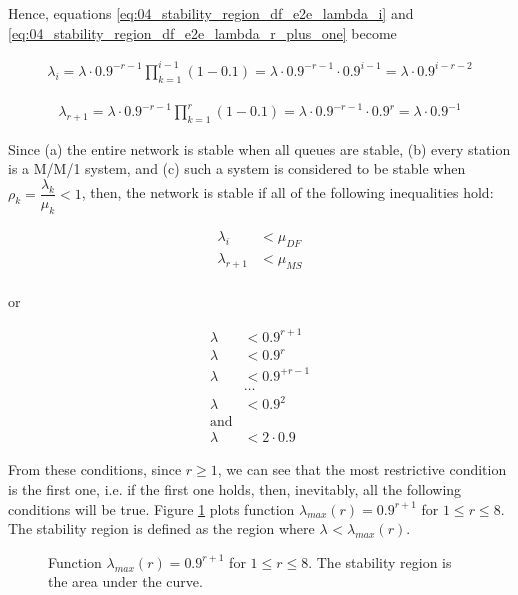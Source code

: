 Hence, equations \ref{eq:04_stability_region_df_e2e_lambda_i} and
\ref{eq:04_stability_region_df_e2e_lambda_r_plus_one} become

\begin{align*}
  \lambda_i = \lambda \cdot 0.9^{-r-1} \prod\limits_{k=1}^{i-1} (1 - 0.1) = \lambda \cdot 0.9^{-r-1} \cdot 0.9^{i-1} = \lambda \cdot 0.9^{i-r-2}
\end{align*}

\begin{align*}
  \lambda_{r+1} = \lambda \cdot 0.9^{-r-1} \prod\limits_{k=1}^{r} (1 - 0.1) = \lambda \cdot 0.9^{-r-1} \cdot 0.9^r = \lambda \cdot 0.9^{-1}
\end{align*}

Since (a) the entire network is stable when all queues are stable, (b) every
station is a M/M/1 system, and (c) such a system is considered to be stable
when $\rho_k = \dfrac{\lambda_k}{\mu_k} < 1$, then, the network is stable if all
of the following inequalities hold:

\begin{align*}
  \lambda_i &< \mu_{DF} \\
  \lambda_{r+1} &< \mu_{MS} \\
\end{align*}

or

\begin{align*}
  \lambda &< 0.9^{r+1} \\
  \lambda &< 0.9^{r} \\
  \lambda &< 0.9^{+r-1} \\
  & \dots \\
  \lambda &< 0.9^2 \\
  \text{and}\\
  \lambda &< 2 \cdot 0.9
\end{align*}

From these conditions, since $r \geq 1$, we can see that the most
restrictive condition is the first one, i.e. if the first one holds, then,
inevitably, all the following conditions will be true. Figure
\ref{fig:04_stability_region_df_e2e} plots function
$\lambda_{max}(r) = 0.9^{r+1}$ for $1 \leq r \leq 8$. The stability
region is defined as the region where $\lambda_{} < \lambda_{max}(r)$.

\begin{figure}\centering
  
  \caption{Function $\lambda_{max}(r) = 0.9^{r+1}$ for $1 \leq r \leq 8$.
    The stability region is the area under the curve.}
  \label{fig:04_stability_region_df_e2e}
\end{figure}

